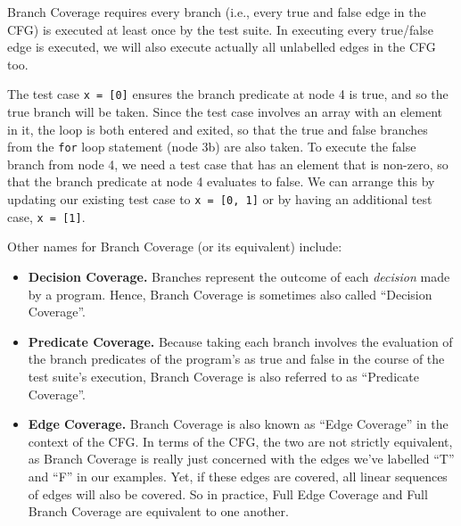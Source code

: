 Branch Coverage requires every branch (i.e., every true and false edge in the
CFG) is executed at least once by the test suite. In executing every true/false
edge is executed, we will also execute actually all unlabelled edges in the CFG
too.

The test case {\tt x = [0]} ensures the branch predicate at node 4 is true, and
so the true branch will be taken. Since the test case involves an array with an
element in it, the loop is both entered and exited, so that the true and false
branches from the {\tt for} loop statement (node 3b) are also taken. To execute
the false branch from node 4, we need a test case that has an element that is
non-zero, so that the branch predicate at node 4 evaluates to false. We can
arrange this by updating our existing test case to {\tt x = [0, 1]} or by having
an additional test case, {\tt x = [1]}.


Other names for Branch Coverage (or its equivalent) include:


\begin{itemize}

    \item {\bf Decision Coverage.} Branches represent the outcome of each {\it
    decision} made by a program. Hence, Branch Coverage is sometimes also called
    ``Decision Coverage''.

    \item {\bf Predicate Coverage.} Because taking each branch involves the
    evaluation of the branch predicates of the program's as true and false in
    the course of the test suite's execution, Branch Coverage is also referred
    to as ``Predicate Coverage''.

    \item {\bf Edge Coverage.} Branch Coverage is also known as ``Edge
    Coverage'' in the context of the CFG. In terms of the CFG, the two are not
    strictly equivalent, as Branch Coverage is really just concerned with the
    edges we've labelled ``T'' and ``F'' in our examples. Yet, if these edges
    are covered, all linear sequences of edges will also be covered. So in
    practice, Full Edge Coverage and Full Branch Coverage are equivalent to one
    another.

\end{itemize}


